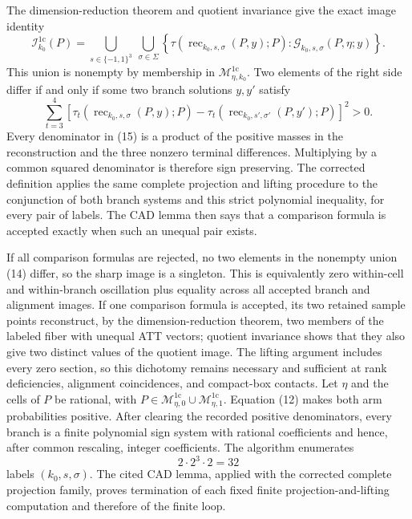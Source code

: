 The dimension-reduction theorem and quotient invariance give the exact image identity
\[
 \mathcal I_{k_0}^{1\mathrm c}(P)
 =\bigcup_{s\in\{-1,1\}^{3}}\ \bigcup_{\sigma\in\Sigma}
 \left\{
 \tau\!\left(\operatorname{rec}_{k_0,s,\sigma}(P,y);P\right):
 \mathscr G_{k_0,s,\sigma}(P,\eta;y)
 \right\}.
 \tag{14}
\]
This union is nonempty by membership in \(\mathcal M_{\eta,k_0}^{1\mathrm c}\).  Two elements of the right side differ if and only if some two branch solutions \(y,y'\) satisfy
\[
 \sum_{t=3}^{4}\left[
 \tau_t\!\left(\operatorname{rec}_{k_0,s,\sigma}(P,y);P\right)
 -\tau_t\!\left(\operatorname{rec}_{k_0,s',\sigma'}(P,y');P\right)
 \right]^2>0.
 \tag{15}
\]
Every denominator in (15) is a product of the positive masses in the reconstruction and the three nonzero terminal differences.  Multiplying by a common squared denominator is therefore sign preserving.  The corrected definition applies the same complete projection and lifting procedure to the conjunction of both branch systems and this strict polynomial inequality, for every pair of labels.  The CAD lemma then says that a comparison formula is accepted exactly when such an unequal pair exists.

If all comparison formulas are rejected, no two elements in the nonempty union (14) differ, so the sharp image is a singleton.  This is equivalently zero within-cell and within-branch oscillation plus equality across all accepted branch and alignment images.  If one comparison formula is accepted, its two retained sample points reconstruct, by the dimension-reduction theorem, two members of the labeled fiber with unequal ATT vectors; quotient invariance shows that they also give two distinct values of the quotient image.  The lifting argument includes every zero section, so this dichotomy remains necessary and sufficient at rank deficiencies, alignment coincidences, and compact-box contacts.
Let \(\eta\) and the cells of \(P\) be rational, with \(P\in\mathcal M_{\eta,0}^{1\mathrm c}\cup\mathcal M_{\eta,1}^{1\mathrm c}\).  Equation (12) makes both arm probabilities positive.  After clearing the recorded positive denominators, every branch is a finite polynomial sign system with rational coefficients and hence, after common rescaling, integer coefficients.  The algorithm enumerates
\[
 2\cdot2^3\cdot2=32
\]
labels \((k_0,s,\sigma)\).  The cited CAD lemma, applied with the corrected complete projection family, proves termination of each fixed finite projection-and-lifting computation and therefore of the finite loop.

